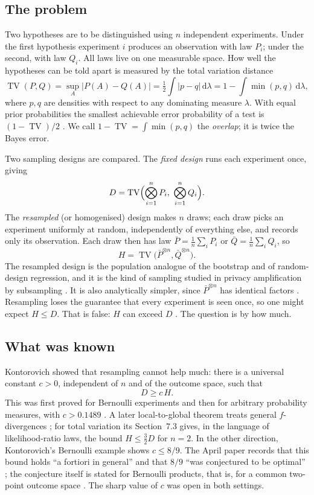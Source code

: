 \documentclass[11pt,a4paper]{article}
\theoremstyle{definition}\newtheorem{definition}[theorem]{Definition}
\theoremstyle{remark}\newtheorem{remark}[theorem]{Remark}
\newcommand{\TV}{\operatorname{TV}}
\newcommand{\dd}{\mathrm d}
\begin{document}
\subsection{The problem}
Two hypotheses are to be distinguished using $n$ independent experiments. Under the first hypothesis experiment $i$ produces an observation with law $P_i$; under the second, with law $Q_i$. All laws live on one measurable space. How well the hypotheses can be told apart is measured by the total variation distance
\[
\TV(P,Q)=\sup_A|P(A)-Q(A)|=\tfrac12\int|p-q|\,\dd\lambda=1-\int\min(p,q)\,\dd\lambda ,
\]
where $p,q$ are densities with respect to any dominating measure $\lambda$. With equal prior probabilities the smallest achievable error probability of a test is $(1-\TV)/2$ \cite[eq.~(1.2)]{KOct}. We call $1-\TV=\int\min(p,q)$ the \emph{overlap}; it is twice the Bayes error.

Two sampling designs are compared. The \emph{fixed design} runs each experiment once, giving
\begin{equation}\label{eq:DH}
D=\TV\Bigl(\bigotimes_{i=1}^nP_i,\ \bigotimes_{i=1}^nQ_i\Bigr).
\end{equation}
The \emph{resampled} (or homogenised) design makes $n$ draws; each draw picks an experiment uniformly at random, independently of everything else, and records only its observation. Each draw then has law $\bar P=\frac1n\sum_iP_i$ or $\bar Q=\frac1n\sum_iQ_i$, so
\[
H=\TV\bigl(\bar P^{\otimes n},\bar Q^{\otimes n}\bigr).
\]
The resampled design is the population analogue of the bootstrap and of random-design regression, and it is the kind of sampling studied in privacy amplification by subsampling \cite{BBG}. It is also analytically simpler, since $\bar P^{\otimes n}$ has identical factors \cite{KApr}. Resampling loses the guarantee that every experiment is seen once, so one might expect $H\le D$. That is false: $H$ can exceed $D$ \cite{KJan}. The question is by how much.

\subsection{What was known}
Kontorovich showed that resampling cannot help much: there is a universal constant $c>0$, independent of $n$ and of the outcome space, such that
\begin{equation}\label{eq:homog}
D\ge c\,H .
\end{equation}
This was first proved for Bernoulli experiments \cite{KJan} and then for arbitrary probability measures, with $c>0.1489$ \cite{KApr}. A later local-to-global theorem treats general $f$-divergences \cite{KOct}; for total variation its Section~7.3 gives, in the language of likelihood-ratio laws, the bound $H\le\frac32D$ for $n=2$. In the other direction, Kontorovich's Bernoulli example shows $c\le8/9$. The April paper records that this bound holds ``a fortiori in general'' and that $8/9$ ``was conjectured to be optimal'' \cite[p.~1]{KApr}; the conjecture itself is stated for Bernoulli products, that is, for a common two-point outcome space \cite[remarks after Theorem~1.5]{KJan}. The sharp value of $c$ was open in both settings.
\end{document}
